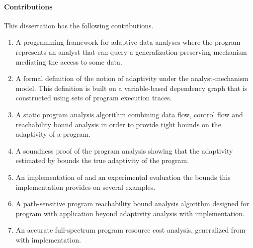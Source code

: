 \paragraph{Contributions}
This dissertation has the following contributions.
\begin{enumerate}
   \item A programming framework for adaptive data analyses where the program represents an analyst that can query a generalization-preserving mechanism mediating the access to some data. 
   \item 
   A formal definition of the notion of adaptivity under the analyst-mechanism model. 
   This definition is built on a variable-based dependency graph that is constructed using sets of program execution traces.
   \item 
   A static program analysis algorithm {\THESYSTEM} combining data flow, control flow and  reachability bound analysis in order to provide tight bounds on the adaptivity of a program. 
   \item A soundness proof of the program analysis showing that the adaptivity estimated by {\THESYSTEM} bounds the true adaptivity of the program. 
   \item An implementation of {\THESYSTEM} and an experimental evaluation the bounds this implementation provides on several examples.
   \item A path-sensitive program reachability bound analysis algorithm designed for program with application beyond adaptivity analysis
    with implementation.
   \item An accurate full-spectrum program resource cost analysis, 
   generalized from {\THESYSTEM} with implementation.
\end{enumerate}
%
